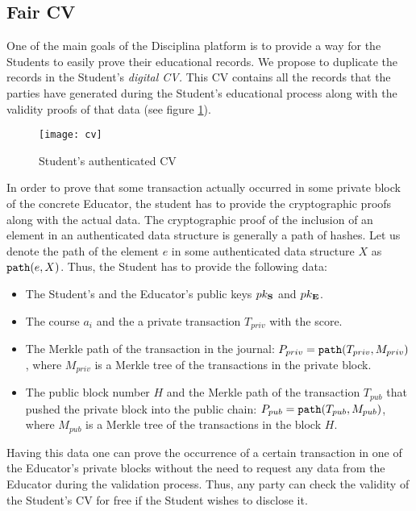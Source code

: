 \subsection{Fair CV}
One of the main goals of the Disciplina platform is to provide a way for the Students to easily prove their educational records. We propose to duplicate the records in the Student's \textit{digital CV.} This CV contains all the records that the parties have generated during the Student's educational process along with the validity proofs of that data (see figure \ref{fig:cv}).

\begin{figure}[ht]
\centering
\texttt{[image: cv]}
\caption{Student's authenticated CV}
\label{fig:cv}
\end{figure}

In order to prove that some transaction actually occurred in some private block of the concrete Educator, the student has to provide the cryptographic proofs along with the actual data. The cryptographic proof of the inclusion of an element in an authenticated data structure is generally a path of hashes. Let us denote the path of the element $e$ in some authenticated data structure $X$ as $\mathtt{path}(e, X)$. Thus, the Student has to  provide the following data:
\begin{itemize}
  \item The Student's and the Educator's public keys $pk_{\mathbf{S}}$ and $pk_{\mathbf{E}}$.
  \item The course $a_i$ and the a private transaction $T_{priv}$ with the score.
  \item The Merkle path of the transaction in the journal: $P_{priv} = \mathtt{path}(T_{priv}, M_{priv})$, where $M_{priv}$ is a Merkle tree of the transactions in the private block.
  \item The public block number $H$ and the Merkle path of the transaction $T_{pub}$ that pushed the private block into the public chain: $P_{pub} = \mathtt{path}(T_{pub}, M_{pub})$, where $M_{pub}$ is a Merkle tree of the transactions in the block $H$.
\end{itemize}

Having this data one can prove the occurrence of a certain transaction in one of the Educator's private blocks without the need to request any data from the Educator during the validation process. Thus, any party can check the validity of the Student's CV for free if the Student wishes to disclose it.

